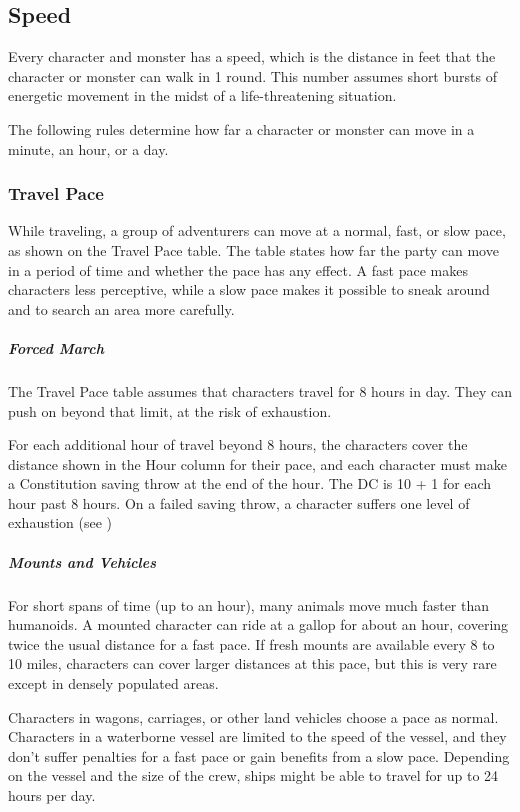 \subsection{Speed}

Every character and monster has a speed, which is the distance in feet that the character or monster can walk in 1 round. This number assumes short bursts of energetic movement in the midst of a life-threatening situation.

The following rules determine how far a character or monster can move in a minute, an hour, or a day.

\subsubsection{Travel Pace}

While traveling, a group of adventurers can move at a normal, fast, or slow pace, as shown on the Travel Pace table. The table states how far the party can move in a period of time and whether the pace has any effect. A fast pace makes characters less perceptive, while a slow pace makes it possible to sneak around and to search an area more carefully.

\subparagraph*{Forced March} The Travel Pace table assumes that characters travel for 8 hours in day. They can push on beyond that limit, at the risk of exhaustion.

For each additional hour of travel beyond 8 hours, the characters cover the distance shown in the Hour column for their pace, and each character must make a Constitution saving throw at the end of the hour. The DC is 10 + 1 for each hour past 8 hours. On a failed saving throw, a character suffers one level of exhaustion (see )

\subparagraph*{Mounts and Vehicles} For short spans of time (up to an hour), many animals move much faster than humanoids. A mounted character can ride at a gallop for about an hour, covering twice the usual distance for a fast pace. If fresh mounts are available every 8 to 10 miles, characters can cover larger distances at this pace, but this is very rare except in densely populated areas.

Characters in wagons, carriages, or other land vehicles choose a pace as normal. Characters in a waterborne vessel are limited to the speed of the vessel, and they don't suffer penalties for a fast pace or gain benefits from a slow pace. Depending on the vessel and the size of the crew, ships might be able to travel for up to 24 hours per day.

